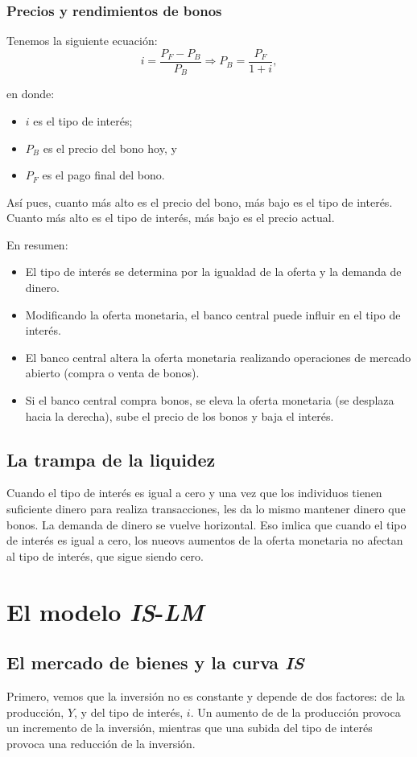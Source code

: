 \documentclass[10pt, landscape]{article}
\begin{document}
\begin{multicols*}{3}
\subsubsection{Precios y rendimientos de bonos}
Tenemos la siguiente ecuación:
\[ i = \frac{P_F - P_B}{P_B} \Longrightarrow P_B = \frac{P_F}{1+i},\]

en donde:
\begin{itemize}
    \item $i$ es el tipo de interés;
    \item $P_B$ es el precio del bono hoy, y
    \item $P_F$ es el pago final del bono.
\end{itemize}

Así pues, cuanto más alto es el precio del bono, más bajo es el tipo de interés. Cuanto más alto es el tipo de interés, más bajo es el precio actual.

En resumen:
\begin{itemize}
    \item El tipo de interés se determina por la igualdad de la oferta y la demanda de dinero.
    \item Modificando la oferta monetaria, el banco central puede influir en el tipo de interés.
    \item El banco central altera la oferta monetaria realizando operaciones de mercado abierto (compra o venta de bonos).
    \item Si el banco central compra bonos, se eleva la oferta monetaria (se desplaza hacia la derecha), sube el precio de los bonos y baja el interés.
\end{itemize}

\subsection{La trampa de la liquidez}
Cuando el tipo de interés es igual a cero y una vez que los individuos tienen suficiente dinero para realiza transacciones, les da lo mismo mantener dinero que bonos. La demanda de dinero se vuelve horizontal. Eso imlica que cuando el tipo de interés es igual a cero, los nueovs aumentos de la oferta monetaria no afectan al tipo de interés, que sigue siendo cero.

\section{El modelo \textit{IS}-\textit{LM}}
\subsection{El mercado de bienes y la curva \textit{IS}}
Primero, vemos que la inversión no es constante y depende de dos factores: de la producción, $Y$, y del tipo de interés, $i$. Un aumento de de la producción provoca un incremento de la inversión, mientras que una subida del tipo de interés provoca una reducción de la inversión.


\end{multicols*}
\end{document}
